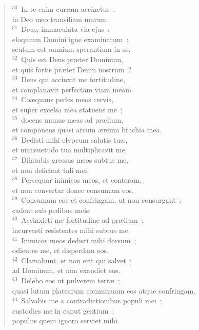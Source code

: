 \begin{verse}
${}^{30}$~In te enim curram accinctus~:\\ in Deo meo transiliam murum.\\
${}^{31}$~Deus, immaculata via ejus~;\\ eloquium Domini igne examinatum~:\\ scutum est omnium sperantium in se.\\
${}^{32}$~Quis est Deus pr\ae ter Dominum,\\ et quis fortis pr\ae ter Deum nostrum~?\\
${}^{33}$~Deus qui accinxit me fortitudine,\\ et complanavit perfectam viam meam.\\
${}^{34}$~Co\ae quans pedes meos cervis,\\ et super excelsa mea statuens me~;\\
${}^{35}$~docens manus meas ad pr\ae lium,\\ et componens quasi arcum \ae reum brachia mea.\\
${}^{36}$~Dedisti mihi clypeum salutis tu\ae ,\\ et mansuetudo tua multiplicavit me.\\
${}^{37}$~Dilatabis gressus meos subtus me,\\ et non deficient tali mei.\\
${}^{38}$~Persequar inimicos meos, et conteram,\\ et non convertar donec consumam eos.\\
${}^{39}$~Consumam eos et confringam, ut non consurgant~:\\ cadent sub pedibus meis.\\
${}^{40}$~Accinxisti me fortitudine ad pr\ae lium~:\\ incurvasti resistentes mihi subtus me.\\
${}^{41}$~Inimicos meos dedisti mihi dorsum~;\\ odientes me, et disperdam eos.\\
${}^{42}$~Clamabunt, et non erit qui salvet~;\\ ad Dominum, et non exaudiet eos.\\
${}^{43}$~Delebo eos ut pulverem terr\ae~;\\ quasi lutum platearum comminuam eos atque confringam.\\
${}^{44}$~Salvabis me a contradictionibus populi mei~;\\ custodies me in caput gentium~:\\ populus quem ignoro serviet mihi.\\

\end{verse}

